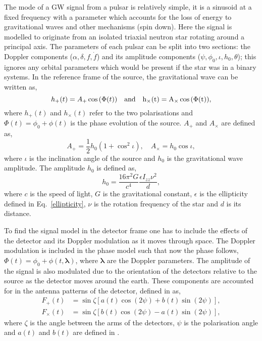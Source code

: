 The mode of a \ac{GW} signal from a pulsar is relatively simple, it is a sinusoid at a fixed frequency with a parameter which accounts for the loss of energy to gravitational waves and other mechanisms (spin down). 
Here the signal is modelled to originate from an isolated triaxial neutron star rotating around a principal axis. 
The parameters of each pulsar can be split into two sections: the Doppler components ($\alpha,\delta,f,\dot{f}$) and its amplitude components ($\psi,\phi_0, \iota, h_0, \theta$); this ignores any orbital parameters which would be present if the star was in a binary systems.
In the reference frame of the source, the gravitational wave can be written as,
\begin{equation}
h_{+}(t) = A_{+}\cos{(\Phi(t))} \quad \rm{and} \quad h_{\times}(t) = A_{\times}\cos{(\Phi(t))},
\end{equation}
where $h_{+}(t)$ and $h_{\times}(t)$ refer to the two polarisations and $\Phi(t) = \phi_0 + \phi(t)$ is the phase evolution of the source. $A_+$ and $A_{\times}$ are defined as,
\begin{equation}
A_+ = \frac{1}{2}h_0(1+\cos^2{\iota}), \quad A_{\times} = h_0 \cos{\iota},
\end{equation}
where $\iota$ is the inclination angle of the source and $h_0$ is the gravitational wave amplitude. The amplitude $h_0$ is defined as,
\begin{equation}
h_0 = \frac{16\pi^2 G}{c^4} \frac{\epsilon I_{zz} \nu^2}{d},
\end{equation}
where $c$ is the speed of light, $G$ is the gravitational constant, $\epsilon $ is the ellipticity defined in Eq.~\ref{ellipticity}, $\nu$ is the rotation frequency of the star and $d$ is its distance. 

To find the signal model in the detector frame one has to include the effects of the detector and its Doppler modulation as it moves through space. 
The Doppler modulation is included in the phase model such that now the phase follows, $\Phi(t) = \phi_0 + \phi(t, {\boldsymbol \lambda})$, where ${\boldsymbol \lambda}$ are the Doppler parameters. 
The amplitude of the signal is also modulated due to the orientation of the detectors relative to the source as the detector moves around the earth. These components are accounted for in the antenna patterns of the detector, defined in \cite{JKS1998} as,
\begin{equation}
\begin{split}
F_{+}(t) &= \sin{\zeta}[a(t)\cos{(2\psi)} + b(t)\sin{(2\psi)}], \\
F_{\times}(t) &= \sin{\zeta}[b(t) \cos{(2\psi)} - a(t)\sin{(2\psi)}],
\end{split}
\end{equation}
where $\zeta$ is the angle between the arms of the detectors, $\psi$ is the polarisation angle and $a(t)$ and $b(t)$ are defined in \cite{JKS1998}. 

